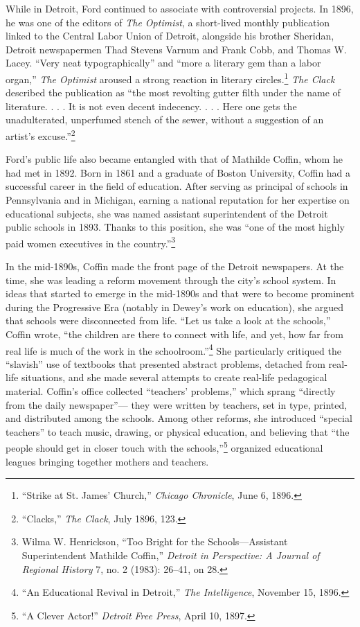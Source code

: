\documentclass[openany,nobib]{tufte-book}
\begin{document}
While in Detroit, Ford continued to associate with controversial
projects. In 1896, he was one of the editors of \emph{The Optimist}, a
short-lived monthly publication linked to the Central Labor Union of
Detroit, alongside his brother Sheridan, Detroit newspapermen Thad
Stevens Varnum and Frank Cobb, and Thomas W. Lacey. ``Very neat
typographically'' and ``more a literary gem than a labor organ,''
\emph{The Optimist} aroused a strong reaction in literary
circles.\footnote{``Strike at St. James' Church,'' \emph{Chicago
  Chronicle}, June 6, 1896.} \emph{The Clack} described the publication
as ``the most revolting gutter filth under the name of literature. . . .
It is not even decent indecency. . . . Here one gets the unadulterated,
unperfumed stench of the sewer, without a suggestion of an artist's
excuse.''\footnote{``Clacks,'' \emph{The Clack}, July 1896, 123.}

Ford's public life also became entangled with that of Mathilde Coffin,
whom he had met in 1892. Born in 1861 and a graduate of Boston
University, Coffin had a successful career in the field of education.
After serving as principal of schools in Pennsylvania and in Michigan,
earning a national reputation for her expertise on educational subjects,
she was named assistant superintendent of the Detroit public schools in
1893. Thanks to this position, she was ``one of the most highly paid
women executives in the country.''\footnote{Wilma W. Henrickson, ``Too
  Bright for the Schools---Assistant Superintendent Mathilde Coffin,''
  \emph{Detroit in Perspective: A Journal of Regional History} 7, no. 2
  (1983): 26--41, on 28.}

In the mid-1890s, Coffin made the front page of the Detroit newspapers.
At the time, she was leading a reform movement through the city's school
system. In ideas that started to emerge in the mid-1890s and that were
to become prominent during the Progressive Era (notably in Dewey's work
on education), she argued that schools were disconnected from life.
``Let us take a look at the schools,'' Coffin wrote, ``the children are
there to connect with life, and yet, how far from real life is much of
the work in the schoolroom.''\footnote{``An Educational Revival in
  Detroit,'' \emph{The Intelligence}, November 15, 1896.} She
particularly critiqued the ``slavish'' use of textbooks that presented
abstract problems, detached from real-life situations, and she made
several attempts to create real-life pedagogical material. Coffin's
office collected ``teachers' problems,'' which sprang ``directly from
the daily newspaper''--- they were written by teachers, set in type,
printed, and distributed among the schools. Among other reforms, she
introduced ``special teachers'' to teach music, drawing, or physical
education, and believing that ``the people should get in closer touch
with the schools,''\footnote{``A Clever Actor!'' \emph{Detroit Free
  Press}, April 10, 1897.} organized educational leagues bringing
together mothers and teachers.
\end{document}
